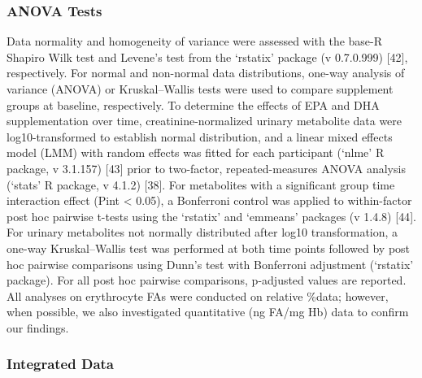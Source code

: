 \documentclass[journal=jacsat,manuscript=article]{achemso}
\begin{document}
\subsubsection{ANOVA Tests}\label{anova-tests}

Data normality and homogeneity of variance were assessed with the base-R
Shapiro Wilk test and Levene's test from the `rstatix' package (v
0.7.0.999) {[}42{]}, respectively. For normal and non-normal data
distributions, one-way analysis of variance (ANOVA) or Kruskal--Wallis
tests were used to compare supplement groups at baseline, respectively.
To determine the effects of EPA and DHA supplementation over time,
creatinine-normalized urinary metabolite data were log10-transformed to
establish normal distribution, and a linear mixed effects model (LMM)
with random effects was fitted for each participant (`nlme' R package, v
3.1.157) {[}43{]} prior to two-factor, repeated-measures ANOVA analysis
(`stats' R package, v 4.1.2) {[}38{]}. For metabolites with a
significant group time interaction effect (Pint \textless{} 0.05), a
Bonferroni control was applied to within-factor post hoc pairwise
t-tests using the `rstatix' and `emmeans' packages (v 1.4.8) {[}44{]}.
For urinary metabolites not normally distributed after log10
transformation, a one-way Kruskal--Wallis test was performed at both
time points followed by post hoc pairwise comparisons using Dunn's test
with Bonferroni adjustment (`rstatix' package). For all post hoc
pairwise comparisons, p-adjusted values are reported. All analyses on
erythrocyte FAs were conducted on relative \%data; however, when
possible, we also investigated quantitative (ng FA/mg Hb) data to
confirm our findings.

\subsubsection{Integrated Data}\label{integrated-data}
\end{document}
